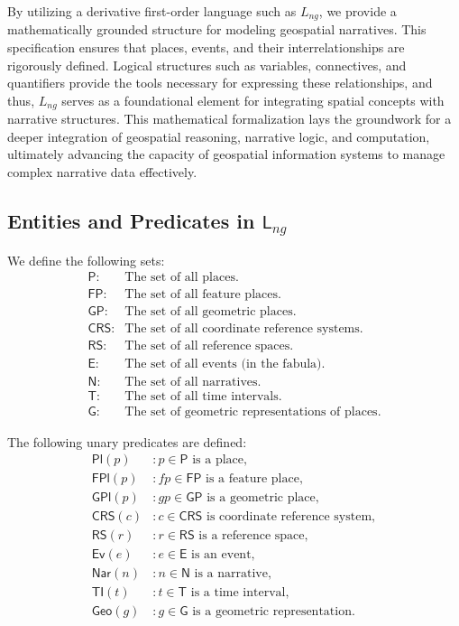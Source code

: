 By utilizing a derivative first-order language such as $L_{ng}$, we provide a mathematically grounded structure for modeling geospatial narratives. This specification ensures that places, events, and their interrelationships are rigorously defined. Logical structures such as variables, connectives, and quantifiers provide the tools necessary for expressing these relationships, and thus, $L_{ng}$ serves as a foundational element for integrating spatial concepts with narrative structures. This mathematical formalization lays the groundwork for a deeper integration of geospatial reasoning, narrative logic, and computation, ultimately advancing the capacity of geospatial information systems to manage complex narrative data effectively.

\subsection{Entities and Predicates in \( \textsf{L}_{ng} \)}\label{V-subsec:lng}

We define the following sets:
\begin{align*}
    \textsf{P}: &  \text{The set of all places.} \\
    \textsf{FP}: & \text{The set of all feature places.} \\
    \textsf{GP}: & \text{The set of all geometric places.} \\
    \textsf{CRS}: & \text{The set of all coordinate reference systems.} \\
    \textsf{RS}: & \text{The set of all reference spaces.} \\
    \textsf{E}: & \text{The set of all events (in the fabula).} \\
    \textsf{N}: & \text{The set of all narratives.} \\
    \textsf{T}: & \text{The set of all time intervals.} \\
    \textsf{G}: & \text{The set of geometric representations of places.}
\end{align*}

The following unary predicates are defined:
\begin{align*}
    \textsf{Pl}(p) &: p \in \textsf{P} \text{ is a place}, \\
    \textsf{FPl}(p) &: fp \in \textsf{FP} \text{ is a feature place}, \\
    \textsf{GPl}(p) &: gp \in \textsf{GP} \text{ is a geometric place}, \\
    \textsf{CRS}(c) &: c \in \textsf{CRS} \text{ is coordinate reference system}, \\
    \textsf{RS}(r) &: r \in \textsf{RS} \text{ is a reference space}, \\
    \textsf{Ev}(e) &: e \in \textsf{E} \text{ is an event}, \\
    \textsf{Nar}(n) &: n \in \textsf{N} \text{ is a narrative}, \\
    \textsf{TI}(t) &: t \in \textsf{T} \text{ is a time interval}, \\
    \textsf{Geo}(g) &: g \in \textsf{G} \text{ is a geometric representation}.
\end{align*}

